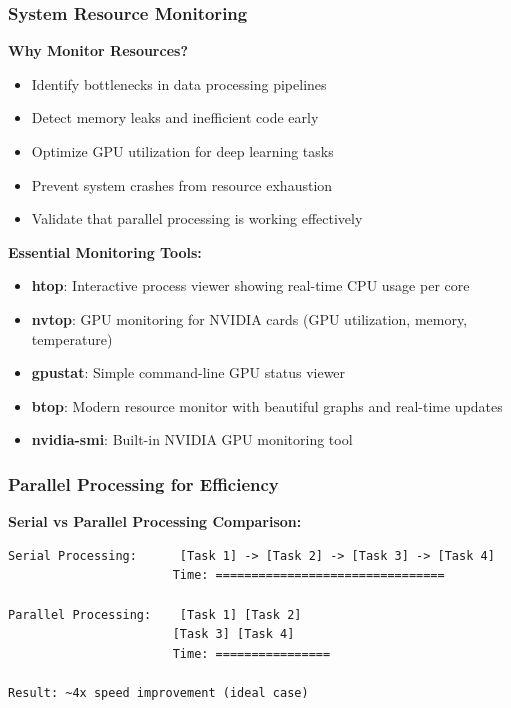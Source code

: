 \documentclass[11pt,a4paper]{article}
\begin{document}
\subsubsection{System Resource Monitoring}

\textbf{Why Monitor Resources?}
\begin{itemize}
    \item Identify bottlenecks in data processing pipelines
    \item Detect memory leaks and inefficient code early
    \item Optimize GPU utilization for deep learning tasks
    \item Prevent system crashes from resource exhaustion
    \item Validate that parallel processing is working effectively
\end{itemize}

\textbf{Essential Monitoring Tools:}
\begin{itemize}
    \item \textbf{htop}: Interactive process viewer showing real-time CPU usage per core
    \item \textbf{nvtop}: GPU monitoring for NVIDIA cards (GPU utilization, memory, temperature)
    \item \textbf{gpustat}: Simple command-line GPU status viewer
    \item \textbf{btop}: Modern resource monitor with beautiful graphs and real-time updates
    \item \textbf{nvidia-smi}: Built-in NVIDIA GPU monitoring tool
\end{itemize}

\subsubsection{Parallel Processing for Efficiency}

\textbf{Serial vs Parallel Processing Comparison:}

\begin{verbatim}
Serial Processing:      [Task 1] -> [Task 2] -> [Task 3] -> [Task 4]
                       Time: ================================
                       
Parallel Processing:    [Task 1] [Task 2]
                       [Task 3] [Task 4]
                       Time: ================
                       
Result: ~4x speed improvement (ideal case)
\end{verbatim}
\end{document}
